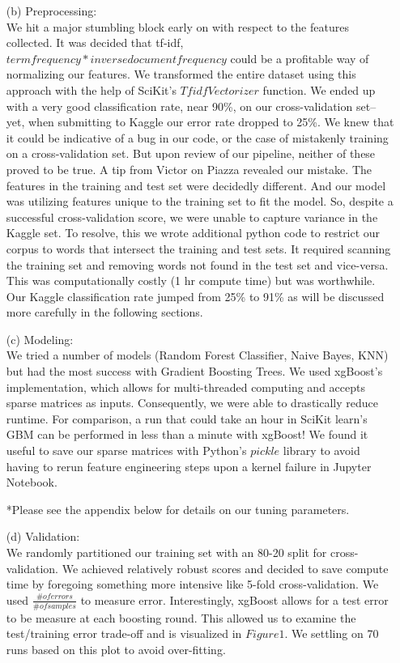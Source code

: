 \documentclass[12pt]{article}
\newcommand\tab[1][0.5cm]{\hspace*{#1}}
\begin{document}
\begin{enumerate}
\item[(b)]
Preprocessing:\\
\tab We hit a major stumbling block early on with respect to the features collected.  It was decided that tf-idf, $term frequency * inverse document frequency$ could be a profitable way of normalizing our features.  We transformed the entire dataset using this approach with the help of SciKit's $TfidfVectorizer$ function.  We ended up with a very good classification rate, near 90\%, on our cross-validation set-- yet, when submitting to Kaggle our error rate dropped to 25\%. We knew that it could be indicative of a bug in our code, or the case of mistakenly training on a cross-validation set.  But upon review of our pipeline, neither of these proved to be true.  A tip from Victor on Piazza revealed our mistake.  The features in the training and test set were decidedly different.  And our model was utilizing features unique to the training set to fit the model.  So, despite a successful cross-validation score, we were unable to capture variance in the Kaggle set.  To resolve, this we wrote additional python code to restrict our corpus to words that intersect the training and test sets.  It required scanning the training set and removing words not found in the test set and vice-versa. This was computationally costly (1 hr compute time) but was worthwhile.  Our Kaggle classification rate jumped from 25\% to 91\% as will be discussed more carefully in the following sections.  
\\

\item[(c)]
Modeling:\\
We tried a number of models (Random Forest Classifier, Naive Bayes, KNN) but had the most success with Gradient Boosting Trees.  We used xgBoost's implementation, which allows for multi-threaded computing and accepts sparse matrices as inputs.  Consequently, we were able to drastically reduce runtime.  For comparison, a run that could take an hour in SciKit learn's GBM can be performed in less than a minute with xgBoost! We found it useful to save our sparse matrices with Python's $pickle$ library to avoid having to rerun feature engineering steps upon a kernel failure in Jupyter Notebook.  

*Please see the appendix below for details on our tuning parameters.  

\item[(d)]
Validation:\\
We randomly partitioned our training set with an 80-20 split for cross-validation.  We achieved relatively robust scores and decided to save compute time by foregoing something more intensive like 5-fold cross-validation.  We used $\frac{\# of errors}{\# of samples}$ to measure error.  Interestingly, xgBoost allows for a test error to be measure at each boosting round.  This allowed us to examine the test/training error trade-off and is visualized in $Figure 1$.  We settling on 70 runs based on this plot to avoid over-fitting.


\end{enumerate}
\end{document}

